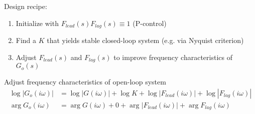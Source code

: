 Design recipe:
\begin{enumerate}
    \item Initialize with $F_{lead}(s) F_{lag}(s) \equiv 1$ (P-control)
    \item Find a $K$ that yields stable closed-loop system (e.g. via Nyquist criterion)
    \item Adjust $F_{lead}(s)$ and $F_{lag}(s)$ to improve frequency characteristics of $G_o(s)$
\end{enumerate}

Adjust frequency characteristics of open-loop system
\begin{align*}
    \log|G_o(i\omega)| &= \log|G(i\omega)| + \log{K} + \log{|F_{lead}(i\omega)|} + \log{|F_{lag}(i\omega)|} \\
    \arg{G_o(i\omega)} &= \arg{G(i\omega)} + 0 + \arg{|{F_{lead}(i\omega)|} + \arg{F_{lag}(i\omega)}}
\end{align*}

